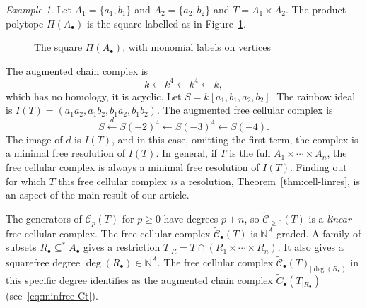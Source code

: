 \documentclass[10pt,a4paper]{article}
\theoremstyle{definition}
\theoremstyle{remark}
\newtheorem{exam}[cdrthm]{Example}
\newcommand{\susst}{\subseteq^*}
\newcommand{\Ctbu}{\tilde{C}_{\bullet}}
\newcommand{\Ctalg}{\tilde{{\mathcal C}}_{\bullet}}
\newcommand{\Ctcal}{\tilde{{\mathcal C}}}
\newcommand{\Cal}{{\mathcal C}}
\theoremstyle{plain}
\newcommand{\vpil}{\leftarrow}
\newcommand{\NN}{{\mathbb N}}
\newcommand{\Ab}{A_\bullet}
\newcommand{\Rb}{R_\bullet}
\begin{document}
\begin{exam} Let $A_1 = \{a_1, b_1\}$ and $A_2 = \{ a_2,b_2\}$ and
  $T = A_1 \times A_2$. The product polytope $\Pi (\Ab)$ is the
  square labelled as in Figure~\ref{fig:cell-square}.

\begin{figure}[ht]
\begin{center}


\end{center}
\caption{The square $\Pi(\Ab)$, with monomial labels on vertices}
\label{fig:cell-square}
\end{figure}
  The augmented chain complex is
  \[ k \vpil k^4 \vpil k^4 \vpil k, \]
  which has no homology, it is acyclic.
  Let $S = k[a_1,b_1, a_2, b_2]$. The rainbow ideal is
  $I(T) = (a_1a_2, a_1b_2, b_1a_2, b_1b_2)$. The augmented  free cellular complex is
  \[ S \overset{d}{\vpil} S(-2)^4 \vpil S(-3)^4 \vpil S(-4). \]
  The image of $d$ is $I(T)$, and in this case,
  omitting the first term,  the complex is a minimal free resolution of $I(T)$. 
In general, if $T$ is the full $A_1 \times \cdots \times A_n$, the free cellular
complex is always a minimal free resolution of $I(T)$. Finding out for
which $T$ this free cellular
complex {\it is} a resolution, Theorem~\ref{thm:cell-linres},
is an aspect of the main result of our article. 
\end{exam}

\setcounter{fact}{0}

The generators of $\Cal_p(T)$ for $p \geq 0$ have degrees $p+n$,
so $\Ctcal_{\geq 0}(T)$ is a {\it linear}
free cellular complex.
The free cellular complex $\Ctalg(T)$ is $\NN^A$-graded. A family of subsets
$\Rb \susst \Ab$ gives a restriction
$T_{|R} = T \cap (R_1 \times \cdots \times R_n)$. 
It also gives a squarefree degree $\deg(\Rb) \in \NN^A$.
The free cellular complex  $\Ctalg(T)_{|\deg(\Rb)}$ in this specific degree
identifies as the augmented chain complex $\Ctbu(T_{|\Rb})$
(see~\eqref{eq:minfree-Ct}).
\end{document}
